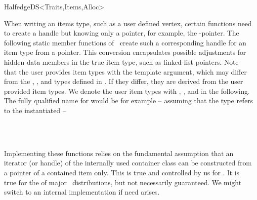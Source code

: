 \begin{ccRefConcept}{HalfedgeDS<Traits,Items,Alloc>}
\begin{ccAdvanced}
When writing an items type, such as a user defined vertex, certain
functions need to create a handle but knowing only a pointer, for
example, the -pointer. The following static member functions
of \ccRefName\ create such a corresponding handle for an item type
from a pointer. This conversion encapsulates possible adjustments for
hidden data members in the true item type, such as linked-list
pointers. Note that the user provides item types with the
 template argument, which may differ from the ,
, and  types defined in \ccRefName. If they 
differ, they are derived from the user provided item types. We denote the
user item types with , , and
 in the following. The fully qualified name for 
 would be for example -- assuming that the type 
refers to the instantiated  --

\mbox{}~~~~~~ \\
\mbox{}~~~~~~

Implementing these functions relies on the fundamental assumption that
an iterator (or handle) of the internally used container class can be
constructed from a pointer of a contained item only. This is true and
controlled by us for . It is true for the
 of major \stl\ distributions, but not necessarily 
guaranteed. We might switch to an internal implementation if need
arises.

\ccGlue
{}

\ccGlue
{}

\ccGlue
{}

\end{ccAdvanced}

\newpage
\ccCreation
{}
\ccThreeToTwo


\end{ccRefConcept}
